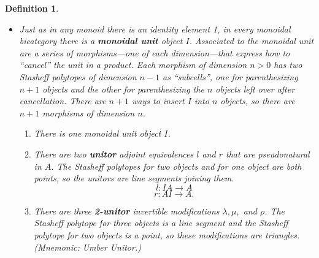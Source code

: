 \documentclass[12pt,twoside,openright]{report}
\newtheorem{defn}{Definition}
\newcommand{\maps}{\colon}
\begin{document}
\begin{defn}
\begin{itemize}
\item Just as in any monoid there is an identity element 1, in every monoidal bicategory there is a {\bf monoidal unit} object $I$. Associated to the monoidal unit are a series of morphisms---one of each dimension---that express how to ``cancel'' the unit in a product. Each morphism of dimension $n>0$ has two Stasheff polytopes of dimension $n-1$ as ``subcells'', one for parenthesizing $n+1$ objects and the other for parenthesizing the $n$ objects left over after cancellation.  There are $n+1$ ways to insert $I$ into $n$ objects, so there are $n+1$ morphisms of dimension $n$.
  \begin{enumerate}
    \item There is one monoidal unit object $I$.
    \item There are two {\bf unitor} adjoint equivalences $l$ and $r$ that are pseudonatural in $A$.  The Stasheff polytopes for two objects and for one object are both points, so the unitors are line segments joining them.
        \[ l\maps I A \rightarrow A \]
        \[ r\maps A I \rightarrow A. \]
    \item There are three {\bf 2-unitor} invertible modifications $\lambda, \mu,$ and $\rho$. The Stasheff polytope for three objects is a line segment and the Stasheff polytope for two objects is a point, so these modifications are triangles.  (Mnemonic: Umber Unitor.)
      \begin{center}
      \end{center}
      \begin{center}
\end{center}
\end{enumerate}
\end{itemize}
\end{defn}
\end{document}
